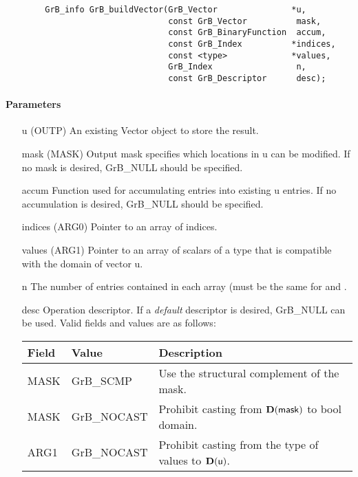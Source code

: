 \begin{verbatim}
        GrB_info GrB_buildVector(GrB_Vector               *u,
                                 const GrB_Vector          mask,
                                 const GrB_BinaryFunction  accum,
                                 const GrB_Index          *indices,
                                 const <type>             *values,
                                 GrB_Index                 n,
                                 const GrB_Descriptor      desc);
\end{verbatim}

\paragraph{Parameters}

\begin{itemize}[leftmargin=1.1in]
        \item[{\sf u}]      ({\sf OUTP}) An existing Vector object to store the result.
        \item[{\sf mask}]   ({\sf MASK}) Output mask specifies which locations in
                        {\sf u} can be modified.  If no mask is desired,
                        {\sf GrB\_NULL} should be specified.
    \item[{\sf accum}]  Function used for accumulating entries into existing
                        {\sf u} entries. If no accumulation is desired,
                        {\sf GrB\_NULL} should be specified.
    \item[{\sf indices}] ({\sf ARG0}) Pointer to an array of indices. 
    \item[{\sf values}] ({\sf ARG1}) Pointer to an array of scalars of a type that
                                     is compatible with the domain of vector {\sf u}.
        \item[{\sf n}]      The number of entries contained in each array (must be the same for  and .
        \item[{\sf desc}]   Operation descriptor. If a
    \emph{default} descriptor is desired, {\sf GrB\_NULL} can be
    used.  Valid fields and values are as follows: \\
        \begin{tabular}{lll}
            Field  & Value & Description \\
            \hline
            {\sf MASK} & {\sf GrB\_SCMP}   & Use the structural complement of the mask. \\
            {\sf MASK} & {\sf GrB\_NOCAST} & Prohibit casting from $\bold{D}({\sf mask})$ to {\sf bool} domain. \\
            {\sf ARG1} & {\sf GrB\_NOCAST} & Prohibit casting from the type of {\sf values} to $\bold{D}(\arg{u})$. \\
        \end{tabular}
\end{itemize}

